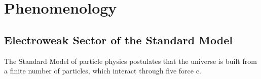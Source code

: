 \chapter{Phenomenology}
\label{wrBosonAndHeavyNu}
\section{Electroweak Sector of the Standard Model}
The Standard Model of particle physics postulates that the universe is built from a finite number of particles, 
which interact through five force c.

